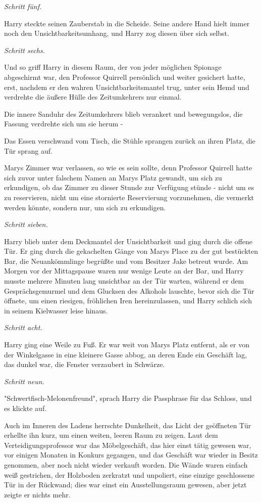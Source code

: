 {\emph{Schritt fünf.}

Harry steckte seinen Zauberstab in die Scheide. Seine andere Hand hielt immer noch den Unsichtbarkeitsumhang, und Harry zog diesen über sich selbst.

\emph{Schritt sechs.}

Und so griff Harry in diesem Raum, der von jeder möglichen Spionage abgeschirmt war, den Professor Quirrell persönlich und weiter gesichert hatte, erst, nachdem er den wahren Unsichtbarkeitsmantel trug, unter sein Hemd und verdrehte die äußere Hülle des Zeitumkehrers nur einmal.

Die innere Sanduhr des Zeitumkehrers blieb verankert und bewegungslos, die Fassung verdrehte sich um sie herum -

Das Essen verschwand vom Tisch, die Stühle sprangen zurück an ihren Platz, die Tür sprang auf.

Marys Zimmer war verlassen, so wie es sein sollte, denn Professor Quirrell hatte sich zuvor unter falschem Namen an Marys Platz gewandt, um sich zu erkundigen, ob das Zimmer zu dieser Stunde zur Verfügung stünde - nicht um es zu reservieren, nicht um eine stornierte Reservierung vorzunehmen, die vermerkt werden könnte, sondern nur, um sich zu erkundigen.

\emph{Schritt sieben.}

Harry blieb unter dem Deckmantel der Unsichtbarkeit und ging durch die offene Tür. Er ging durch die gekachelten Gänge von Marys Place zu der gut bestückten Bar, die Neuankömmlinge begrüßte und vom Besitzer Jake betreut wurde. Am Morgen vor der Mittagspause waren nur wenige Leute an der Bar, und Harry musste mehrere Minuten lang unsichtbar an der Tür warten, während er dem Gesprächsgemurmel und dem Glucksen des Alkohols lauschte, bevor sich die Tür öffnete, um einen riesigen, fröhlichen Iren hereinzulassen, und Harry schlich sich in seinem Kielwasser leise hinaus.

\emph{Schritt acht.}

Harry ging eine Weile zu Fuß. Er war weit von Marys Platz entfernt, als er von der Winkelgasse in eine kleinere Gasse abbog, an deren Ende ein Geschäft lag, das dunkel war, die Fenster verzaubert in Schwärze.

\emph{Schritt neun.}

"Schwertfisch-Melonenfreund", sprach Harry die Passphrase für das Schloss, und es klickte auf.

Auch im Inneren des Ladens herrschte Dunkelheit, das Licht der geöffneten Tür erhellte ihn kurz, um einen weiten, leeren Raum zu zeigen. Laut dem Verteidigungsprofessor war das Möbelgeschäft, das hier einst tätig gewesen war, vor einigen Monaten in Konkurs gegangen, und das Geschäft war wieder in Besitz genommen, aber noch nicht wieder verkauft worden. Die Wände waren einfach weiß gestrichen, der Holzboden zerkratzt und unpoliert, eine einzige geschlossene Tür in der Rückwand; dies war einst ein Ausstellungsraum gewesen, aber jetzt zeigte er nichts mehr.

}
